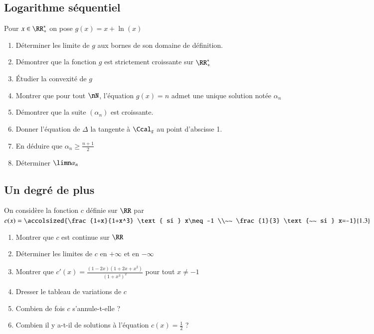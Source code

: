 \documentclass[oneside,12pt]{article}          %
\begin{document}
\subsection{Logarithme séquentiel}
Pour $x\in\RR^*_+$ on pose $g(x)=x+\ln(x)$
\begin{enumerate}
	\item Déterminer les limite de $g$ aux bornes de son domaine de définition.
	\item Démontrer que la fonction $g$ est strictement croissante sur $\RR^*_+$
	\item Étudier la convexité de $g$
	\item Montrer que pour tout $\nN$, l'équation $g(x)=n$ admet une unique solution notée $\alpha_n$
	\item Démontrer que la suite $(\alpha_n)$ est croissante.
	\item Donner l'équation de $\Delta$ la tangente à $\Ccal_g$ au point d'abscisse 1.
	\item En déduire que $\alpha_n\geq\frac{n+1}{2}$
	\item Déterminer $\limn\alpha_n$
\end{enumerate}



\subsection{Un degré de plus}
On considère la fonction $c$ définie sur $\RR$ par $c(x)=\accolsized{\frac{1+x}{1+x^3} \text{ si } x\neq-1 \\~~ \frac{1}{3} \text{~~ si } x=-1}{1.3}$
\begin{enumerate}
	\item Montrer que $c$ est continue sur $\RR$
    \item Déterminer les limites de $c$ en $+\infty$ et en $-\infty$
    \item Montrer que $c'(x)=\frac{(1-2x)(1+2x+x^2)}{(1+x^3)^2}$ pour tout $x\neq-1$
    \item Dresser le tableau de variations de $c$
    \item Combien de fois $c$ s'annule-t-elle ?
    \item Combien il y a-t-il de solutions à l'équation $c(x)=\frac{1}{2}$ ?
\end{enumerate}
\end{document}
